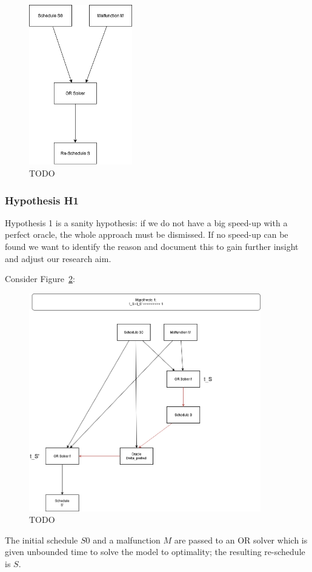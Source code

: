 \documentclass{article}
\begin{document}
\begin{figure}[hbtp]
	\centering
  \includegraphics[width=0.4\textwidth]{introduction_no_loop.png}
	\caption{TODO}
	\label{fig:introduction_no_loop}
\end{figure}





\subsubsection{Hypothesis H1}\label{subec:H1}

Hypothesis 1 is a sanity hypothesis: if we do not have a big speed-up with a perfect oracle, the whole approach must be dismissed. If no speed-up can be found we want to identify the reason and document this to gain further insight and adjust our research aim.

Consider Figure~\ref{fig:introduction_H1}:
%
\begin{figure}[hbtp]
	\centering
  \includegraphics[width=0.9\textwidth]{introduction_H1.png}
	\caption{TODO}
	\label{fig:introduction_H1}
\end{figure}
%
The initial schedule $S0$ and a malfunction $M$ are passed to an OR solver which is given unbounded time to solve the model to optimality; the resulting re-schedule is $S$.
\end{document}
